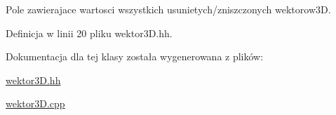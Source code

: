 Pole zawierajace wartosci wszystkich usunietych/zniszczonych wektorow3D. 

Definicja w linii 20 pliku wektor3\+D.\+hh.



Dokumentacja dla tej klasy została wygenerowana z plików\+:\begin{DoxyCompactItemize}
\item 
\mbox{\hyperlink{wektor3_d_8hh}{wektor3\+D.\+hh}}\item 
\mbox{\hyperlink{wektor3_d_8cpp}{wektor3\+D.\+cpp}}\end{DoxyCompactItemize}
